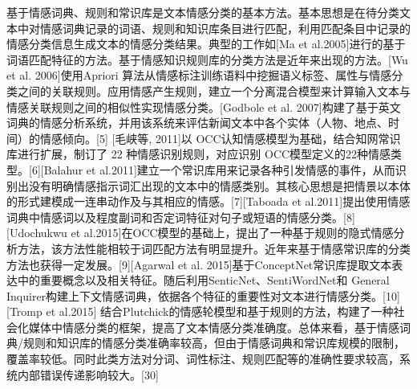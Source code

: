 基于情感词典、规则和常识库是文本情感分类的基本方法。基本思想是在待分类文本中对情感词典记录的词语、规则和知识库条目进行匹配，利用匹配条目中记录的情感分类信息生成文本的情感分类结果。典型的工作如[Ma et al.2005]进行的基于词语匹配特征的方法。基于情感知识规则库的分类方法是近年来出现的方法。[Wu et al. 2006]使用Apriori 算法从情感标注训练语料中挖掘语义标签、属性与情感分类之间的关联规则。应用情感产生规则，建立一个分离混合模型来计算输入文本与情感关联规则之间的相似性实现情感分类。[Godbole et al. 2007]构建了基于英文词典的情感分析系统，并用该系统来评估新闻文本中各个实体（人物、地点、时间）的情感倾向。[5] [毛峡等, 2011]以 OCC认知情感模型为基础，结合知网常识库进行扩展，制订了 22 种情感识别规则，对应识别 OCC模型定义的22种情感类型。[6][Balahur et al.2011]建立一个常识库用来记录各种引发情感的事件，从而识别出没有明确情感指示词汇出现的文本中的情感类别。其核心思想是把情景以本体的形式建模成一连串动作及与其相应的情感。[7][Taboada et al.2011]提出使用情感词典中情感词以及程度副词和否定词特征对句子或短语的情感分类。[8][Udochukwu et al.2015]在OCC模型的基础上，提出了一种基于规则的隐式情感分析方法，该方法性能相较于词匹配方法有明显提升。近年来基于情感常识库的分类方法也获得一定发展。[9][Agarwal et al. 2015]基于ConceptNet常识库提取文本表达中的重要概念以及相关特征。随后利用SenticNet、SentiWordNet和 General Inquirer构建上下文情感词典，依据各个特征的重要性对文本进行情感分类。[10][Tromp et al.2015] 结合Plutchick的情感轮模型和基于规则的方法，构建了一种社会化媒体中情感分类的框架，提高了文本情感分类准确度。总体来看，基于情感词典/规则和知识库的情感分类准确率较高，但由于情感词典和常识库规模的限制，覆盖率较低。同时此类方法对分词、词性标注、规则匹配等的准确性要求较高，系统内部错误传递影响较大。[30]

